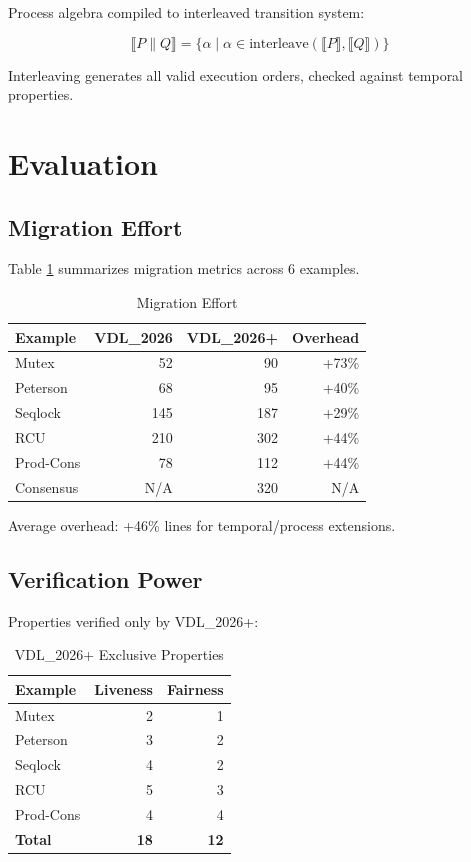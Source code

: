 \documentclass[conference]{IEEEtran}
\begin{document}
Process algebra compiled to interleaved transition system:

\begin{equation}
\llbracket P \parallel Q \rrbracket = \{ \alpha \mid \alpha \in \text{interleave}(\llbracket P \rrbracket, \llbracket Q \rrbracket) \}
\end{equation}

Interleaving generates all valid execution orders, checked against temporal properties.

\section{Evaluation}
\label{sec:evaluation}

\subsection{Migration Effort}

Table \ref{tab:migration} summarizes migration metrics across 6 examples.

\begin{table}[h]
\centering
\caption{Migration Effort}
\label{tab:migration}
\begin{tabular}{|l|r|r|r|}
\hline
\textbf{Example} & \textbf{VDL\_2026} & \textbf{VDL\_2026+} & \textbf{Overhead} \\
\hline
Mutex & 52 & 90 & +73\% \\
Peterson & 68 & 95 & +40\% \\
Seqlock & 145 & 187 & +29\% \\
RCU & 210 & 302 & +44\% \\
Prod-Cons & 78 & 112 & +44\% \\
Consensus & N/A & 320 & N/A \\
\hline
\end{tabular}
\end{table}

Average overhead: +46\% lines for temporal/process extensions.

\subsection{Verification Power}

Properties verified only by VDL\_2026+:

\begin{table}[h]
\centering
\caption{VDL\_2026+ Exclusive Properties}
\begin{tabular}{|l|r|r|}
\hline
\textbf{Example} & \textbf{Liveness} & \textbf{Fairness} \\
\hline
Mutex & 2 & 1 \\
Peterson & 3 & 2 \\
Seqlock & 4 & 2 \\
RCU & 5 & 3 \\
Prod-Cons & 4 & 4 \\
\hline
\textbf{Total} & \textbf{18} & \textbf{12} \\
\hline
\end{tabular}
\end{table}
\end{document}
